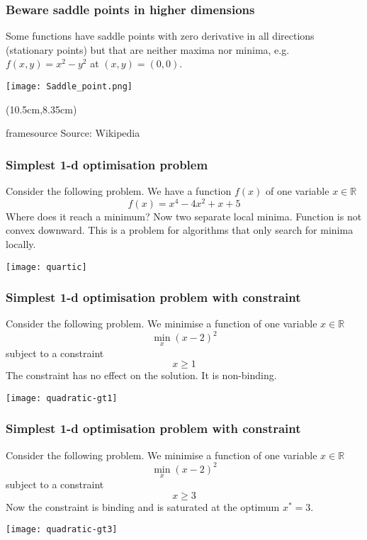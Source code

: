 \documentclass[10pt,aspectratio=169,dvipsnames]{beamer}
\newcommand{\source}[1]{\begin{textblock*}{5cm}(10.5cm,8.35cm)
    \begin{beamercolorbox}[ht=0.5cm,right]{framesource}
        \usebeamerfont{framesource}\usebeamercolor[fg]{framesource} Source: {#1}
    \end{beamercolorbox}
\end{textblock*}}
\begin{document}
\begin{frame}
  \frametitle{Beware saddle points in higher dimensions}

  Some functions have \alert{saddle points} with zero derivative in all directions (stationary points) but that are neither maxima nor minima, e.g. $f(x,y) = x^2 - y^2$ at $(x,y) = (0,0)$.

  \centering
  \texttt{[image: Saddle\_point.png]}

  \source{Wikipedia}

\end{frame}

\begin{frame}
  \frametitle{Simplest 1-d optimisation problem}

  Consider the following problem. We have a function $f(x)$ of one variable $x \in \mathbb{R}$
  \begin{equation*}
    f(x) = x^4 -4x^2+x +5
  \end{equation*}
  Where does it reach a minimum? Now two separate local minima. Function is \alert{not convex} downward. This is a problem for algorithms that only search for minima locally.

  \centering
  \texttt{[image: quartic]}
\end{frame}


\begin{frame}
  \frametitle{Simplest 1-d optimisation problem with constraint}

  Consider the following problem. We minimise a function of one variable $x \in \mathbb{R}$
  \begin{equation*}
      \min_x (x-2)^2
  \end{equation*}
  subject to a constraint
  \begin{equation*}
       x \geq 1
  \end{equation*}
  The constraint has \alert{no effect} on the solution. It is \alert{non-binding}.

  \centering
  \texttt{[image: quadratic-gt1]}
\end{frame}

\begin{frame}
  \frametitle{Simplest 1-d optimisation problem with constraint}

  Consider the following problem. We minimise a function of one variable $x \in \mathbb{R}$
  \begin{equation*}
      \min_x (x-2)^2
  \end{equation*}
  subject to a constraint
  \begin{equation*}
       x \geq 3
  \end{equation*}
  Now the constraint is \alert{binding} and is \alert{saturated} at the optimum $x^* = 3$.

  \centering
  \texttt{[image: quadratic-gt3]}
\end{frame}
\end{document}
